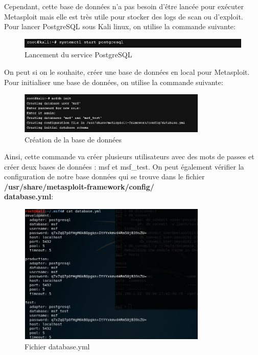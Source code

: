  Cependant, cette base de données n'a pas besoin d'être lancée pour exécuter Metasploit mais elle est très utile pour stocker des logs de scan ou d'exploit.\\

 Pour lancer PostgreSQL sous Kali linux, on utilise la commande suivante:
\begin{figure}[htp!]
  \centering
  \setlength\figureheight{7cm}
  \setlength\figurewidth{9cm}
  \includegraphics[width=1\textwidth]{oui/Ancien/imangeancien/metasploit/db_launch.PNG}
  \caption{Lancement du service PostgreSQL}
  \label{fig:courbe-tikz}
\end{figure}

 On peut si on le souhaite, créer une base de données en local pour Metasploit. Pour initialiser une base de données, on utilise la commande suivante:

\begin{figure}[htp!]
  \centering
  \setlength\figureheight{7cm}
  \setlength\figurewidth{9cm}
  \includegraphics[width=0.8\textwidth]{oui/Ancien/imangeancien/metasploit/db_init.PNG}
  \caption{Création de la base de données}
  \label{fig:courbe-tikz}
\end{figure}

Ainsi, cette commande va créer plusieurs utilisateurs avec des mots de passes et créer deux bases de données : msf et msf\_test. On peut également vérifier la configuration de notre base données qui se trouve dans le fichier \textbf{/usr/share/metasploit-framework/config/ \\ database.yml}:


\begin{figure}[htp!]
  \centering
  \setlength\figureheight{7cm}
  \setlength\figurewidth{9cm}
  \includegraphics[width=0.8\textwidth]{oui/Ancien/imangeancien/metasploit/database.PNG}
  \caption{Fichier database.yml}
  \label{fig:courbe-tikz}
\end{figure}


